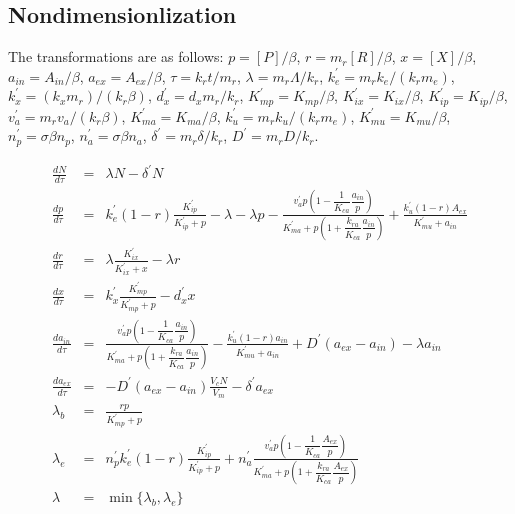 \documentclass[11pt]{article}
\begin{document}
{  \subsection{Nondimensionlization}
  The transformations are as follows:
$p=[P]/\beta$, $r=m_r[R]/\beta$, $x=[X]/\beta$, $a_{in}=A_{in}/\beta$, $a_{ex}=A_{ex}/\beta$, $\tau=k_r t/m_r$, $\lambda=m_r\Lambda/k_r$, $k_e^\prime=m_rk_e/(k_rm_e)$, $k_x^\prime=(k_xm_r)/(k_r\beta)$, $d_x^\prime = d_xm_r/k_r$, $K_{mp}^\prime = K_{mp}/\beta$, $K_{ix}^\prime = K_{ix}/\beta$, $K_{ip}^{\prime}=K_{ip}/\beta$, $v_a^\prime=m_rv_a/(k_r\beta)$, $K_{ma}^\prime=K_{ma}/\beta$,  $k_{u}^{\prime}=m_rk_u/(k_rm_e)$, $K_{mu}^{\prime}=K_{mu}/\beta$, $n_p^\prime=\sigma  \beta n_p$, $n_a^\prime=\sigma  \beta n_a$, $ \delta^\prime= m_r \delta/k_r$, $ D^\prime= m_r D/k_r$.

\small
\allowdisplaybreaks[1]
\begin{eqnarray}
\frac{dN}{d\tau} &=& \lambda N - \delta^\prime N \label{eq1:dndtau_nd2}\\
\frac{dp}{d\tau} &=& k_e^{\prime}(1-r)\frac{K_{ip}^\prime}{K_{ip}^{\prime}+p}-\lambda-\lambda p-\frac{v_a^{\prime}p\left(1-\dfrac{1}{K_{ca}}\dfrac{a_{in}}{p}\right)}{K_{ma}^{\prime}+p\left(1+\dfrac{k_{ra}}{K_{ca}}\dfrac{a_{in}}{p}\right)} +\frac{k_u^{\prime}(1-r) A_{ex}}{K_{mu}^{\prime}+a_{in}} \label{eq1:dpdtau_nd2}\\
\frac{dr}{d\tau} &=& \lambda\frac{K_{ix}^{\prime}}{K_{ix}^\prime+x}-\lambda r \label{eq:drdtau_nd2}\\
\frac{dx}{d\tau} &=& k_x^{\prime}\frac{K_{mp}^{\prime}}{K_{mp}^{\prime}+p}-d_x^{\prime}x \label{eq:dxdtau_nd2}\\
\frac{da_{in}}{d\tau} &=& \frac{v_a^{\prime}p\left(1-\dfrac{1}{K_{ca}}\dfrac{a_{in}}{p}\right)}{K_{ma}^{\prime}+p\left(1+\dfrac{k_{ra}}{K_{ca}}\dfrac{a_{in}}{p}\right)} -\frac{k_u^{\prime}(1-r) a_{in}}{K_{mu}^{\prime}+a_{in}} +D^\prime(a_{ex}-a_{in})  -\lambda a_{in}\\
\frac{da_{ex}}{d\tau} &=& -D^\prime (a_{ex}-a_{in}) \frac{V_c N}{V_m} - \delta^\prime a_{ex} \\
\lambda_b &=& \frac{rp}{K_{mp}^\prime+p} \\
\lambda_e &=& n_p^{\prime}k_e^{\prime}(1-r)\frac{K_{ip}^\prime}{K_{ip}^{\prime}+p} +n_a^{\prime} \frac{v_a^{\prime}p\left(1-\dfrac{1}{K_{ca}}\dfrac{A_{ex}}{p}\right)}{K_{ma}^{\prime}+p\left(1+\dfrac{k_{ra}}{K_{ca}}\dfrac{A_{ex}}{p}\right)}\\
\lambda &=& \min\{\lambda_b, \lambda_e\}
  \end{eqnarray}
  
}
\end{document}
